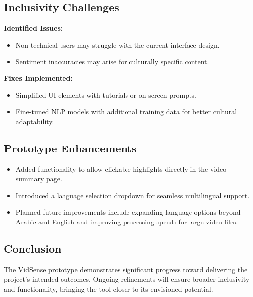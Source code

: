 \documentclass{bscs}
\begin{document}
\subsection{Inclusivity Challenges}
\textbf{Identified Issues:}
\begin{itemize}
    \item Non-technical users may struggle with the current interface design.
    
    \item Sentiment inaccuracies may arise for culturally specific content.
\end{itemize}

\textbf{Fixes Implemented:}
\begin{itemize}
    \item Simplified UI elements with tutorials or on-screen prompts.
    \item Fine-tuned NLP models with additional training data for better cultural adaptability.
\end{itemize}

\subsection{Prototype Enhancements}
\begin{itemize}
    \item Added functionality to allow clickable highlights directly in the video summary page.
    \item Introduced a language selection dropdown for seamless multilingual support.
    \item Planned future improvements include expanding language options beyond Arabic and English and improving processing speeds for large video files.
\end{itemize}

\subsection{Conclusion}
The VidSense prototype demonstrates significant progress toward delivering the project's intended outcomes. Ongoing refinements will ensure broader inclusivity and functionality, bringing the tool closer to its envisioned potential.
\end{document}

